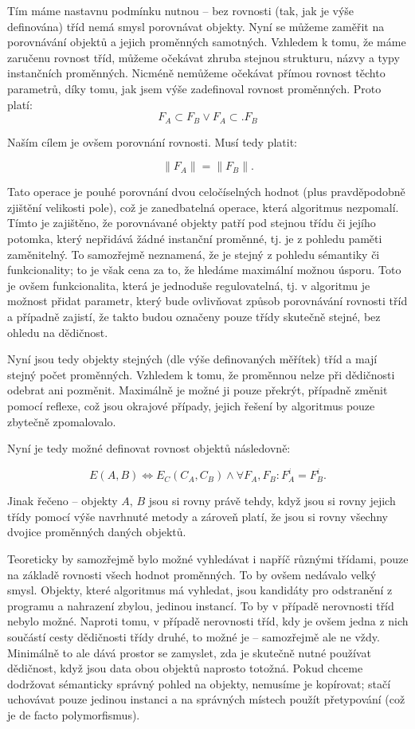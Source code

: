Tím máme nastavnu podmínku nutnou -- bez rovnosti (tak, jak je výše definována) tříd nemá smysl porovnávat objekty. Nyní se můžeme zaměřit na porovnávání objektů a jejich proměnných samotných. Vzhledem k tomu, že máme zaručenu rovnost tříd, můžeme očekávat zhruba stejnou strukturu, názvy a typy instančních proměnných. Nicméně nemůžeme očekávat přímou rovnost těchto parametrů, díky tomu, jak jsem výše zadefinoval rovnost proměnných. Proto platí:
    $$ F_A \subset F_B \vee F_A \subset. F_B $$

Naším cílem je ovšem porovnání rovnosti. Musí tedy platit:

    $$ \|F_A\| = \|F_B\|.$$

Tato operace je pouhé porovnání dvou celočíselných hodnot (plus pravděpodobně zjištění velikosti pole), což je zanedbatelná operace, která algoritmus nezpomalí. Tímto je zajištěno, že porovnávané objekty patří pod stejnou třídu či jejího potomka, který nepřidává žádné instanční proměnné, tj. je z pohledu paměti zaměnitelný. To samozřejmě neznamená, že je stejný z pohledu sémantiky či funkcionality; to je však cena za to, že hledáme maximální možnou úsporu. Toto je ovšem funkcionalita, která je jednoduše regulovatelná, tj. v algoritmu je možnost přidat parametr, který bude ovlivňovat způsob porovnávání rovnosti tříd a případně zajistí, že takto budou označeny pouze třídy skutečně stejné, bez ohledu na dědičnost.

Nyní jsou tedy objekty stejných (dle výše definovaných měřítek) tříd a mají stejný počet proměnných. Vzhledem k tomu, že proměnnou nelze při dědičnosti odebrat ani pozměnit. Maximálně je možné ji pouze překrýt, případně změnit pomocí reflexe, což jsou okrajové případy, jejich řešení by algoritmus pouze zbytečně zpomalovalo.

Nyní je tedy možné definovat rovnost objektů následovně:

    $$ E(A, B) \Leftrightarrow E_C(C_A, C_B) \wedge \forall F_A, F_B: F_A^i = F_B^i.$$

Jinak řečeno -- objekty $A$, $B$ jsou si rovny právě tehdy, když jsou si rovny jejich třídy pomocí výše navrhnuté metody a zároveň platí, že jsou si rovny všechny dvojice proměnných daných objektů. 

Teoreticky by samozřejmě bylo možné vyhledávat i napříč různými třídami, pouze na základě rovnosti všech hodnot proměnných. To by ovšem nedávalo velký smysl. Objekty, které algoritmus má vyhledat, jsou kandidáty pro odstranění z programu a nahrazení zbylou, jedinou instancí. To by v případě nerovnosti tříd nebylo možné. Naproti tomu, v případě nerovnosti tříd, kdy je ovšem jedna z nich součástí cesty dědičnosti třídy druhé, to možné je -- samozřejmě ale ne vždy. Minimálně to ale dává prostor se zamyslet, zda je skutečně nutné používat dědičnost, když jsou data obou objektů naprosto totožná. Pokud chceme dodržovat sémanticky správný pohled na objekty, nemusíme je kopírovat; stačí uchovávat pouze jedinou instanci a na správných místech použít přetypování (což je de facto polymorfismus).

